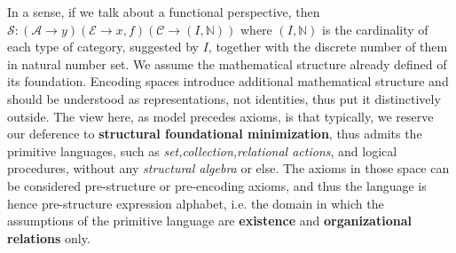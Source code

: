 In a sense, if we talk about a functional perspective, then $\mathcal{S}:(\mathcal{A}\to y)(\mathcal{E}\to x,f)(\mathcal{C}\to (I,\mathbb{N}))$ where $(I,\mathbb{N})$ is the cardinality of each type of category, suggested by $I$, together with the discrete number of them in natural number set. We assume the mathematical structure already defined of its foundation. Encoding spaces introduce additional mathematical structure and should be understood as representations, not identities, thus put it distinctively outside. The view here, as model precedes axioms, is that typically, we reserve our deference to \textbf{structural foundational minimization}, thus admits the primitive languages, such as \textit{set,collection,relational actions}, and logical procedures, without any \textit{structural algebra} or else. The axioms in those space can be considered pre-structure or pre-encoding axioms, and thus the language is hence pre-structure expression alphabet, i.e. the domain in which the assumptions of the primitive language are \textbf{existence} and \textbf{organizational relations} only. 
